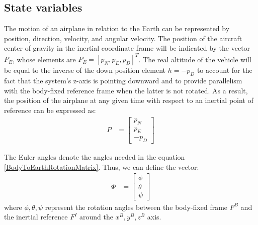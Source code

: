 \documentclass[conference]{IEEEtran}
\begin{document}
\subsection{State variables}
The motion of an airplane in relation to the Earth can be represented by
position, direction, velocity, and angular velocity. The position of the
aircraft center of gravity in the inertial coordinate frame will be indicated
by the vector $P_E$, whose elements are $P_E={[p_N,p_E,p_D]}^T$. The real
altitude of the vehicle will be equal to the inverse of the down position
element $h=-p_D$ to account for the fact that the system's z-axis is pointing
downward and to provide parallelism with the body-fixed reference frame when
the latter is not rotated. As a result, the position of the airplane at any
given time with respect to an inertial point of reference can be expressed as:
\begin{align}
    P & = \begin{bmatrix}
              p_N \\
              p_E \\
              -p_D
          \end{bmatrix}
    \label{PostionVectorInInertialMatrixWithInverseDownComponent}
\end{align}
\par
The Euler angles denote the angles needed in the equation
    {\ref{BodyToEarthRotationMatrix}}. Thus, we can define the vector:
\begin{align}
    \varPhi & = \begin{bmatrix}
                    \phi   \\
                    \theta \\
                    \psi
                \end{bmatrix}
    \label{EulerAnglesVector}
\end{align}
where $\phi,\theta,\psi$ represent the rotation angles between the body-fixed frame $F^B$ and the inertial reference $F^I$ around the $x^B,y^B,z^B$ axis.
\end{document}
